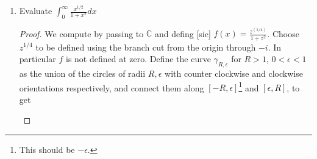 \documentclass{article}
\begin{document}
\begin{enumerate}
\begin{proof}
	Cauchy's inequality tells us that on a circle of radius $R$ about $z_0$, call it $\gamma_R$, that
	\[ | f^{(n)} (z_0) |\leq \frac{n! \max_{z \in \gamma_R} |f(z)|}{R^n} \]
	to extract the coefficients $\alpha_n$ from $f$ note that 
	\[ \alpha_n = f^{(n)}(0)/n!\]
	so taking $z_0 = 0$, we get 
	\[ | \frac{f^{(n)}(0)}{n!}| = |\alpha_n| = \leq \frac{\max_{z \in \gamma_R} |f(z)|}{R^n} \] 
	The provided bound tells us that $\max_{C_R} |f(z)| \leq C \cdot \log (1+R)$ and so
	\[ | \alpha_n | \leq \frac{C \log (1+R)}{R^n} \]
	This is independent of $R$, so we take the limit 
	\[ \lim_{R \rightarrow \infty} \frac{C log(1+R)}{R^n} = \lim_{R \rightarrow \infty} \frac{C \frac{1}{1+R}}{nR^{n-1}} \;\;\; \text{(by L'H\^opitals [sic] rule)}\]
	which vanishes for $n \geq 1$. So $f$ is constant, but we can do better. If $f$ is constant,
	$f(z) \equiv f(0)$. So $|f| \leq C \log(1+|0|) = 0$, so $f$ is identically 0 on $\mathbb{C}$.
	\end{proof}
	
	\item Evaluate $\int_0^\infty \frac{x^{1/2}}{1+x^2} dx$
	
	\begin{proof}
	We compute by passing to $\mathbb{C}$ and defing [sic] $f(x) = \frac{z^{(1/4)}}{1+z^2}$.
	Choose $z^{1/4}$ to be defined using the branch cut from the origin through $-i$. In particular
	$f$ is not defined at zero. Define the curve $\gamma_{R,\epsilon}$ for $R>1$, $0 < \epsilon < 1$ as the
	union of the circles of radii $R, \epsilon$ with counter clockwise and clockwise orientations respectively,
	and connect them along $[-R, \epsilon]$\footnote{This should be $-\epsilon$.} and $[\epsilon, R]$, to get
	
		\begin{center}
\end{center}
\end{proof}
\end{enumerate}
\end{document}

